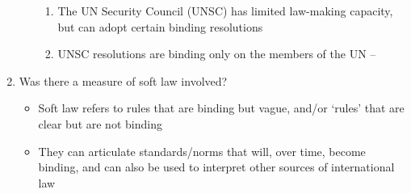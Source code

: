 \begin{enumerate}
\begin{enumerate}
        \begin{enumerate}
            \item The UN Security Council (UNSC) has limited law-making capacity, but can adopt certain binding resolutions
            \item UNSC resolutions are binding only on the members of the UN -- 
        \end{enumerate}
    \end{enumerate}
    \item Was there a measure of soft law involved?
    \begin{itemize}
        \item Soft law refers to rules that are binding but vague, and/or `rules' that are clear but are not binding
        \item They can articulate standards/norms that will, over time, become binding, and can also be used to interpret other sources of international law
    \end{itemize}
\end{enumerate}


